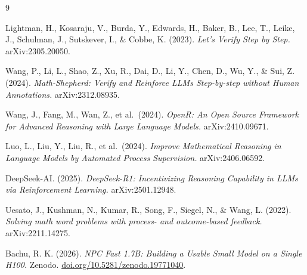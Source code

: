 \documentclass[10pt,letterpaper]{article}
\begin{document}
\begin{thebibliography}{9}

Lightman, H., Kosaraju, V., Burda, Y., Edwards, H., Baker, B., Lee, T., Leike, J., Schulman, J., Sutskever, I., \& Cobbe, K. (2023).
\textit{Let's Verify Step by Step.}
arXiv:2305.20050.

Wang, P., Li, L., Shao, Z., Xu, R., Dai, D., Li, Y., Chen, D., Wu, Y., \& Sui, Z. (2024).
\textit{Math-Shepherd: Verify and Reinforce LLMs Step-by-step without Human Annotations.}
arXiv:2312.08935.

Wang, J., Fang, M., Wan, Z., et al.\ (2024).
\textit{OpenR: An Open Source Framework for Advanced Reasoning with Large Language Models.}
arXiv:2410.09671.

Luo, L., Liu, Y., Liu, R., et al.\ (2024).
\textit{Improve Mathematical Reasoning in Language Models by Automated Process Supervision.}
arXiv:2406.06592.

DeepSeek-AI. (2025).
\textit{DeepSeek-R1: Incentivizing Reasoning Capability in LLMs via Reinforcement Learning.}
arXiv:2501.12948.

Uesato, J., Kushman, N., Kumar, R., Song, F., Siegel, N., \& Wang, L. (2022).
\textit{Solving math word problems with process- and outcome-based feedback.}
arXiv:2211.14275.

Bachu, R. K. (2026).
\textit{NPC Fast 1.7B: Building a Usable Small Model on a Single H100.}
Zenodo. \href{https://doi.org/10.5281/zenodo.19771040}{doi.org/10.5281/zenodo.19771040}.

\end{thebibliography}
\end{document}
